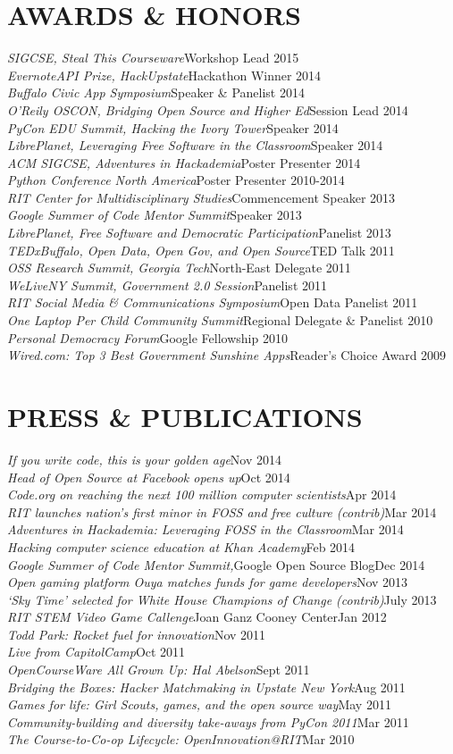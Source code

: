 \documentclass[margin]{res}
\newcommand{\award}[2]{{\it #1}\hfill #2\\}
\newcommand{\publication}[3]{{\it #1}#2\hfill #3\\}
\begin{document}
\begin{resume}
\section{AWARDS \& HONORS}
    \award{SIGCSE, Steal This Courseware}{Workshop Lead 2015}
    \award{EvernoteAPI Prize, HackUpstate}{Hackathon Winner 2014}
    \award{Buffalo Civic App Symposium}{Speaker \& Panelist 2014}
    \award{O'Reily OSCON, Bridging Open Source and Higher Ed}{Session Lead 2014}
    \award{PyCon EDU Summit, Hacking the Ivory Tower}{Speaker 2014}
    \award{LibrePlanet, Leveraging Free Software in the Classroom}{Speaker 2014}
    \award{ACM SIGCSE, Adventures in Hackademia}{Poster Presenter 2014}
    \award{Python Conference North America}{Poster Presenter 2010-2014}
    \award{RIT Center for Multidisciplinary Studies}{Commencement Speaker 2013}
    \award{Google Summer of Code Mentor Summit}{Speaker 2013}
    \award{LibrePlanet, Free Software and Democratic Participation}{Panelist 2013}
    \award{TEDxBuffalo, Open Data, Open Gov, and Open Source}{TED Talk 2011}
    \award{OSS Research Summit, Georgia Tech}{North-East Delegate 2011}
    \award{WeLiveNY Summit, Government 2.0 Session}{Panelist 2011}
    \award{RIT Social Media \& Communications Symposium}{Open Data Panelist 2011}
    \award{One Laptop Per Child Community Summit}{Regional Delegate \& Panelist 2010}
    \award{Personal Democracy Forum}{Google Fellowship 2010}
    \award{Wired.com: Top 3 Best Government Sunshine Apps}{Reader's Choice Award 2009}

\pagebreak

\section{PRESS \& PUBLICATIONS}
    \publication{If you write code, this is your golden age}{}{Nov 2014}
    \publication{Head of Open Source at Facebook opens up}{}{Oct 2014}
    \publication{Code.org on reaching the next 100 million computer scientists}{}{Apr 2014}
    \publication{RIT launches nation's first minor in FOSS and free culture (contrib)}{}{Mar 2014}
    \publication{Adventures in Hackademia: Leveraging FOSS in the Classroom}{}{Mar 2014}
    \publication{Hacking computer science education at Khan Academy}{}{Feb 2014}
    \publication{Google Summer of Code Mentor Summit,}{Google Open Source Blog}{Dec 2014}
    \publication{Open gaming platform Ouya matches funds for game developers}{}{Nov 2013}
    \publication{`Sky Time' selected for White House Champions of Change (contrib)}{}{July 2013}
    \publication{RIT STEM Video Game Callenge}{Joan Ganz Cooney Center}{Jan 2012}
    \publication{Todd Park: Rocket fuel for innovation}{}{Nov 2011}
    \publication{Live from CapitolCamp}{}{Oct 2011}
    \publication{OpenCourseWare All Grown Up: Hal Abelson}{}{Sept 2011}
    \publication{Bridging the Boxes: Hacker Matchmaking in Upstate New York}{}{Aug 2011}
    \publication{Games for life: Girl Scouts, games, and the open source way}{}{May 2011}
    \publication{Community-building and diversity take-aways from PyCon 2011}{}{Mar 2011}
    \publication{The Course-to-Co-op Lifecycle: OpenInnovation@RIT}{}{Mar 2010}



\end{resume}
\end{document}
